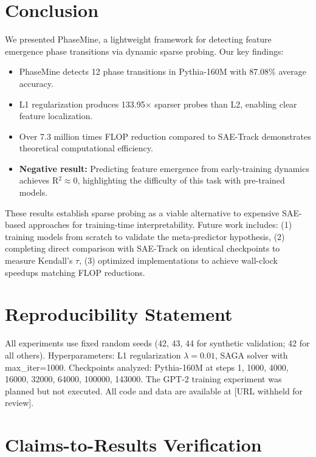 \documentclass{article}
\begin{document}
\section{Conclusion}

We presented PhaseMine, a lightweight framework for detecting feature emergence phase transitions via dynamic sparse probing. Our key findings:

\begin{itemize}
    \item PhaseMine detects 12 phase transitions in Pythia-160M with 87.08\% average accuracy.
    \item L1 regularization produces 133.95$\times$ sparser probes than L2, enabling clear feature localization.
    \item Over 7.3 million times FLOP reduction compared to SAE-Track demonstrates theoretical computational efficiency.
    \item \textbf{Negative result:} Predicting feature emergence from early-training dynamics achieves R$^2 \approx 0$, highlighting the difficulty of this task with pre-trained models.
\end{itemize}

These results establish sparse probing as a viable alternative to expensive SAE-based approaches for training-time interpretability. Future work includes: (1) training models from scratch to validate the meta-predictor hypothesis, (2) completing direct comparison with SAE-Track on identical checkpoints to measure Kendall's $\tau$, (3) optimized implementations to achieve wall-clock speedups matching FLOP reductions.

\section*{Reproducibility Statement}

All experiments use fixed random seeds (42, 43, 44 for synthetic validation; 42 for all others). Hyperparameters: L1 regularization $\lambda=0.01$, SAGA solver with max\_iter=1000. Checkpoints analyzed: Pythia-160M at steps 1, 1000, 4000, 16000, 32000, 64000, 100000, 143000. The GPT-2 training experiment was planned but not executed. All code and data are available at [URL withheld for review].

\section*{Claims-to-Results Verification}
\end{document}
